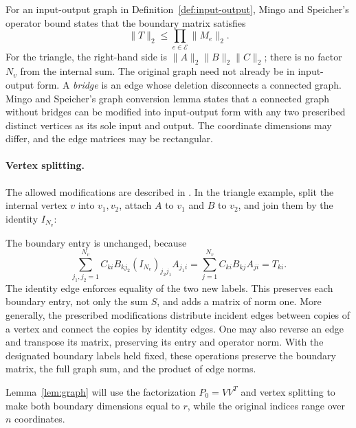 \documentclass[11pt]{article}
\theoremstyle{definition}
\theoremstyle{remark}
\theoremstyle{plain}
\begin{document}
For an input-output graph in Definition~\ref{def:input-output},
Mingo and Speicher's operator bound
\cite[Theorem~11(1), p.~2281]{mingo} states that the boundary matrix satisfies
\[
 \|T\|_2\le\prod_{e\in\mathcal E}\|M_e\|_2.
\]
For the triangle, the right-hand side is
$\|A\|_2\|B\|_2\|C\|_2$; there is no factor $N_v$ from the
internal sum. The original graph need not already be in input-output
form. A \emph{bridge} is an edge whose deletion disconnects a
connected graph. Mingo and Speicher's graph conversion lemma
\cite[Lemma~16, p.~2286]{mingo} states that a connected graph without bridges can be modified
into input-output form with any two prescribed distinct vertices
as its sole input and output. The coordinate dimensions may differ,
and the edge matrices may be rectangular.

\paragraph{Vertex splitting.}
The allowed modifications are described in
\cite[Definition~13 and Proposition~14, p.~2285]{mingo}. In the triangle
example, split the internal vertex $v$ into $v_1,v_2$, attach $A$
to $v_1$ and $B$ to $v_2$, and join them by the identity $I_{N_v}$:
\begin{center}
\end{center}
The boundary entry is unchanged, because
\[
 \sum_{j_1,j_2=1}^{N_v}
 C_{ki}B_{k j_2}(I_{N_v})_{j_2j_1}A_{j_1i}
 =\sum_{j=1}^{N_v}C_{ki}B_{kj}A_{ji}=T_{ki}.
\]
The identity edge enforces equality of the two new labels. This
preserves each boundary entry, not only the sum $S$, and adds a
matrix of norm one. More generally, the prescribed modifications
distribute incident edges between copies of a vertex and connect
the copies by identity edges. One may also reverse an edge and
transpose its matrix, preserving its entry and operator norm.
With the designated boundary labels held fixed, these operations
preserve the boundary matrix, the full graph sum, and the product
of edge norms.

Lemma~\ref{lem:graph} will use the factorization $P_0=VV^T$ and
vertex splitting to make both boundary dimensions equal to $r$,
while the original indices range over $n$ coordinates.
\end{document}
